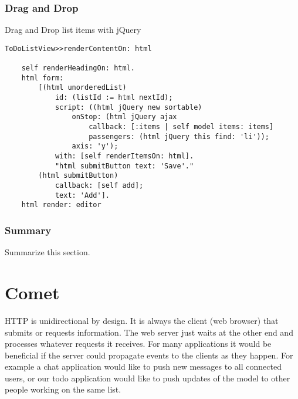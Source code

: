 \documentclass[a4paper,10pt,twoside]{book}
\newenvironment{todo}%
	{\obeylines\comment}%
	{\endtrivlist\normalsize}
\begin{document}
\subsection{Drag and Drop}
\label{book:web20:jquery:enhancedtodoapplication:draganddrop}

\begin{todo}
Drag and Drop list items with jQuery

\end{todo}

\begin{lstlisting}
ToDoListView>>renderContentOn: html

    self renderHeadingOn: html.
    html form: 
        [(html unorderedList)
            id: (listId := html nextId);
            script: ((html jQuery new sortable)
                onStop: (html jQuery ajax
                    callback: [:items | self model items: items]
                    passengers: (html jQuery this find: 'li'));
                axis: 'y');
            with: [self renderItemsOn: html].
            "html submitButton text: 'Save'."
        (html submitButton)
            callback: [self add];
            text: 'Add'].
    html render: editor
\end{lstlisting}

\subsection{Summary}
\label{book:web20:jquery:enhancedtodoapplication:summary}

\begin{todo}
Summarize this section.

\end{todo}

\chapter{Comet}
\label{book:web20:comet}

HTTP is unidirectional by design. It is always the client (web browser) that submits or requests information. The web server just waits at the other end and processes whatever requests it receives. For many applications it would be beneficial if the server could propagate events to the clients as they happen. For example a chat application would like to push new messages to all connected users, or our todo application would like to push updates of the model to other people working on the same list.
\end{document}
